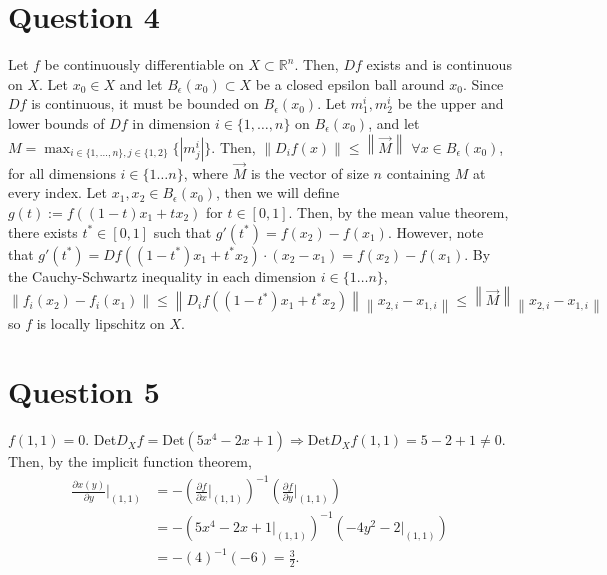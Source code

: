 \documentclass[11pt]{article} %
\newcommand{\norm}[1]{\left\lVert#1\right\rVert}
\begin{document}
\section{Question 4}
Let $f$ be continuously differentiable on $X \subset \mathbb{R}^n$. Then, $Df$ exists and is continuous on $ X.$ Let $x_0 \in X$ and let $B_{\epsilon}(x_0) \subset X$ be a closed epsilon ball around $x_0$. Since $Df$ is continuous, it must be bounded on $B_{\epsilon}(x_0)$. Let $m_1^i,m_2^i$ be the upper and lower bounds of $Df$ in dimension $i \in \{ 1,\dots,n\}$ on $B_{\epsilon}(x_0)$, and let $M = \max_{i \in \{1,\dots,n \}, j \in \{ 1,2\} }\{|m_j^i|\}$. Then, $\norm{D_if(x)}\leq \norm{\vec{M}}$ $\forall x \in B_{\epsilon}(x_0)$, for all dimensions $i \in \{ 1 \dots n\}$, where $\vec{M}$ is the vector of size $n $ containing $M$ at every index. Let $x_1,x_2 \in B_{\epsilon}(x_0)$, then we will define $g(t):= f((1-t)x_1 + tx_2)$ for $t \in [0,1].$ Then, by the mean value theorem, there exists $t^{*} \in [0,1]$ such that $g'(t^{*})  = f(x_2) - f(x_1).$ However, note that $g'(t^{*}) = Df((1-t^{*})x_1 + t^{*}x_2)\cdot (x_2 - x_1) = f(x_2) - f(x_1)$. By the Cauchy-Schwartz inequality in each dimension $i \in \{ 1 \dots n\}$, $\norm{f_i(x_2) - f_i(x_1)}\leq \norm{D_if((1-t^{*})x_1 + t^{*}x_2)}\norm{x_{2,i} - x_{1,i}}\leq \norm{\vec{M}}\norm{x_{2,i}-x_{1,i}}$ so $f$ is locally lipschitz on $X$.
\section{Question 5}
$f(1,1) = 0.$ Det$D_Xf = \text{Det} (5x^4 - 2x +1) \Rightarrow \text{Det}D_Xf(1,1) = 5 - 2+1 \neq 0.$ Then, by the implicit function theorem,
\begin{align*}
\frac{\partial x(y)}{\partial y}|_{(1,1)} &= - \left(\frac{\partial f}{\partial x}|_{(1,1)}\right)^{-1}\left(\frac{\partial f}{\partial y}|_{(1,1)}\right) \\
&= - (5x^4 - 2x + 1 |_{(1,1)})^{-1}(-4y^2 - 2|_{(1,1)})\\
&= - (4)^{-1}(-6) = \frac{3}{2}.
\end{align*}
\end{document}
